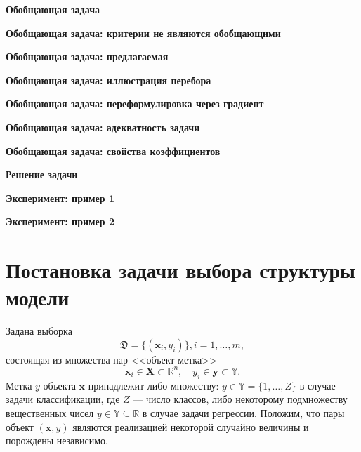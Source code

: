 \textbf{Обобщающая задача}


\textbf{Обобщающая задача: критерии не являются обобщающими}

\textbf{Обобщающая задача: предлагаемая}


\textbf{Обобщающая задача: иллюстрация перебора}

\textbf{Обобщающая задача: переформулировка через градиент}

\textbf{Обобщающая задача: адекватность задачи}

\textbf{Обобщающая задача: свойства коэффициентов}

\textbf{Решение задачи}

\textbf{Эксперимент: пример 1}

\textbf{Эксперимент: пример 2}
































\iffalse


\section{Постановка задачи выбора структуры модели}
Задана выборка \begin{equation}\label{eq:dataset}\mathfrak{D} = \{(\mathbf{x}_i,y_i)\}, i = 1,\dots,m,\end{equation} состоящая из множества пар <<объект-метка>> $$\mathbf{x}_i \in \mathbf{X} \subset \mathbb{R}^n, \quad {y}_i \in \mathbf{y} \subset \mathbb{Y}.$$ Метка ${y}$  объекта $\mathbf{x}$ принадлежит либо множеству: ${y} \in \mathbb{Y} = \{1, \dots, Z\}$ в случае задачи классификации, где $Z$ --- число классов, либо некоторому подмножеству вещественных чисел ${y} \in \mathbb{Y}  \subseteq \mathbb{R}$ в случае задачи регрессии. Положим, что пары объект $(\mathbf{x}, y)$ являются реализацией некоторой случайно величины и порождены независимо.


